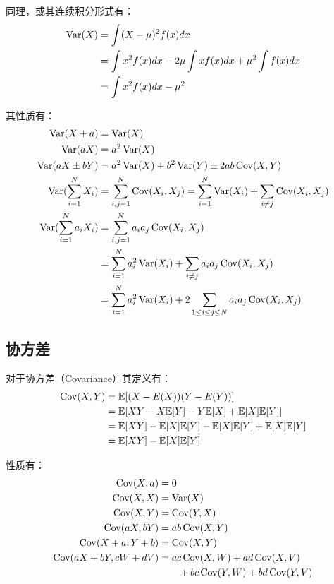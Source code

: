\documentclass[11pt]{article}
\begin{document}
同理，或其连续积分形式有：
\begin{align*}
    \operatorname{Var}(X) &= \int (X-\mu)^2 f(x) dx \\
    &= \int x^2 f(x) dx - 2\mu \int xf(x)dx + \mu^2 \int f(x)dx \\
    &= \int x^2 f(x) dx - \mu^2
\end{align*}

其性质有：
\begin{align*}
    \operatorname{Var}(X + a) &= \operatorname{Var}(X) \\
    \operatorname{Var}(aX) &= a^2\operatorname{Var}(X) \\
    \operatorname{Var}(aX \pm bY) &= a^2\operatorname{Var}(X) + b^2\operatorname{Var}(Y) \pm 2ab \operatorname{Cov}(X,Y) \\
    \operatorname{Var}(\sum_{i=1}^{N} X_i) &= \sum_{i,j=1}^{N}\operatorname{Cov}(X_i,X_j) = \sum_{i=1}^{N}\operatorname{Var}(X_i) + \sum_{i \neq j}\operatorname{Cov}(X_i,X_j) \\
    \operatorname{Var}(\sum_{i=1}^{N} a_i X_i) &= \sum_{i,j=1}^{N}a_i a_j\operatorname{Cov}(X_i,X_j) \\
    &= \sum_{i=1}^{N}a_i^2\operatorname{Var}(X_i) + \sum_{i \neq j} a_i a_j \operatorname{Cov}(X_i,X_j) \\
    &= \sum_{i=1}^{N}a_i^2\operatorname{Var}(X_i) + 2\sum_{1 \leq i \leq j \leq N} a_i a_j \operatorname{Cov}(X_i,X_j)
\end{align*}

\subsection{协方差}

对于协方差（Covariance）其定义有：
\begin{align*}
    \operatorname{Cov}(X,Y) &= \mathbb{E}[(X-E(X))(Y-E(Y))] \\
    &= \mathbb{E}[XY - X\mathbb{E}[Y] -Y\mathbb{E}[X]+ \mathbb{E}[X]\mathbb{E}[Y]] \\
    &= \mathbb{E}[XY] - \mathbb{E}[X]\mathbb{E}[Y] - \mathbb{E}[X]\mathbb{E}[Y] + \mathbb{E}[X]\mathbb{E}[Y] \\
    &= \mathbb{E}[XY] - \mathbb{E}[X]\mathbb{E}[Y]
\end{align*}

性质有：
\begin{align*}
    \operatorname{Cov}(X,a) &= 0 \\
    \operatorname{Cov}(X,X) &= \operatorname{Var}(X) \\
    \operatorname{Cov}(X,Y) &= \operatorname{Cov}(Y,X) \\
    \operatorname{Cov}(aX,bY) &= ab\operatorname{Cov}(X,Y) \\
    \operatorname{Cov}(X+a,Y+b) &= \operatorname{Cov}(X,Y) \\
    \operatorname{Cov}(aX+bY,cW+dV) &= ac\operatorname{Cov}(X,W)+ad\operatorname{Cov}(X,V) \\
    &\hspace{2em} +bc\operatorname{Cov}(Y,W)+bd\operatorname{Cov}(Y,V)
\end{align*}
\end{document}

